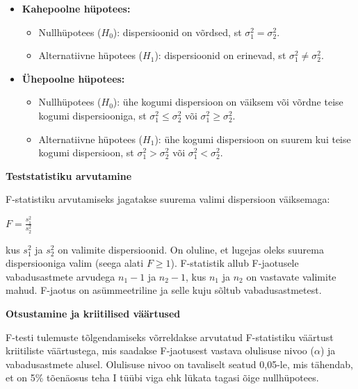 \documentclass[
]{book}
\providecommand{\tightlist}{%
  \setlength{\itemsep}{0pt}\setlength{\parskip}{0pt}}
\theoremstyle{definition}
\theoremstyle{definition}
\theoremstyle{definition}
\theoremstyle{definition}
\theoremstyle{remark}
\begin{document}
\begin{itemize}
\tightlist
\item
  \textbf{Kahepoolne hüpotees:}

  \begin{itemize}
  \tightlist
  \item
    Nullhüpotees (\(H_0\)): dispersioonid on võrdsed, st \(\sigma_1^2 = \sigma_2^2\).
  \item
    Alternatiivne hüpotees (\(H_1\)): dispersioonid on erinevad, st \(\sigma_1^2 \neq \sigma_2^2\).
  \end{itemize}
\item
  \textbf{Ühepoolne hüpotees:}

  \begin{itemize}
  \tightlist
  \item
    Nullhüpotees (\(H_0\)): ühe kogumi dispersioon on väiksem või võrdne teise kogumi dispersiooniga, st \(\sigma_1^2 \leq \sigma_2^2\) või \(\sigma_1^2 \geq \sigma_2^2\).
  \item
    Alternatiivne hüpotees (\(H_1\)): ühe kogumi dispersioon on suurem kui teise kogumi dispersioon, st \(\sigma_1^2 > \sigma_2^2\) või \(\sigma_1^2 < \sigma_2^2\).
  \end{itemize}
\end{itemize}

\textbf{Teststatistiku arvutamine}

F-statistiku arvutamiseks jagatakse suurema valimi dispersioon väiksemaga:

\(F = \frac{s_1^2}{s_2^2}\)

kus \(s_1^2\) ja \(s_2^2\) on valimite dispersioonid. On oluline, et lugejas oleks suurema dispersiooniga valim (seega alati \(F \geq 1\)). F-statistik allub F-jaotusele vabadusastmete arvudega \(n_1 - 1\) ja \(n_2 - 1\), kus \(n_1\) ja \(n_2\) on vastavate valimite mahud. F-jaotus on asümmeetriline ja selle kuju sõltub vabadusastmetest.

\textbf{Otsustamine ja kriitilised väärtused}

F-testi tulemuste tõlgendamiseks võrreldakse arvutatud F-statistiku väärtust kriitiliste väärtustega, mis saadakse F-jaotusest vastava olulisuse nivoo (\(\alpha\)) ja vabadusastmete alusel. Olulisuse nivoo on tavaliselt seatud 0,05-le, mis tähendab, et on 5\% tõenäosus teha I tüübi viga ehk lükata tagasi õige nullhüpotees.
\end{document}
